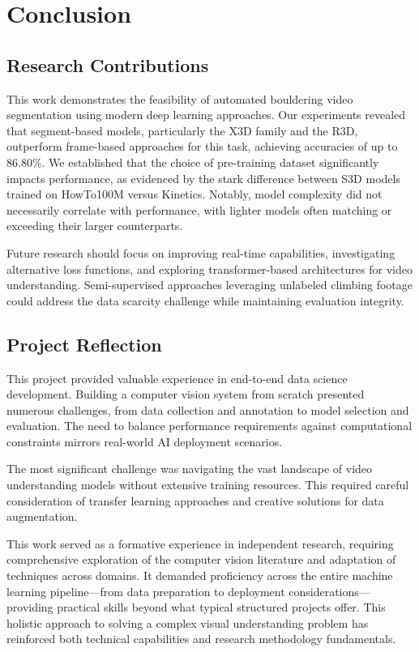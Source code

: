\section{Conclusion}

\subsection*{Research Contributions}
This work demonstrates the feasibility of automated bouldering video segmentation using modern deep learning approaches. Our experiments revealed that segment-based models, particularly the X3D family and the R3D, outperform frame-based approaches for this task, achieving accuracies of up to 86.80\%. We established that the choice of pre-training dataset significantly impacts performance, as evidenced by the stark difference between S3D models trained on HowTo100M versus Kinetics. Notably, model complexity did not necessarily correlate with performance, with lighter models often matching or exceeding their larger counterparts.

Future research should focus on improving real-time capabilities, investigating alternative loss functions, and exploring transformer-based architectures for video understanding. Semi-supervised approaches leveraging unlabeled climbing footage could address the data scarcity challenge while maintaining evaluation integrity.

\subsection*{Project Reflection}
This project provided valuable experience in end-to-end data science development. Building a computer vision system from scratch presented numerous challenges, from data collection and annotation to model selection and evaluation. The need to balance performance requirements against computational constraints mirrors real-world AI deployment scenarios.

The most significant challenge was navigating the vast landscape of video understanding models without extensive training resources. This required careful consideration of transfer learning approaches and creative solutions for data augmentation.

This work served as a formative experience in independent research, requiring comprehensive exploration of the computer vision literature and adaptation of techniques across domains. It demanded proficiency across the entire machine learning pipeline—from data preparation to deployment considerations—providing practical skills beyond what typical structured projects offer. This holistic approach to solving a complex visual understanding problem has reinforced both technical capabilities and research methodology fundamentals.